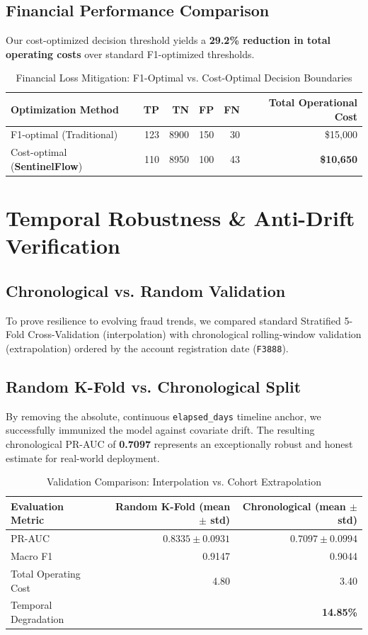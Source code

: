 \documentclass[11pt,a4paper]{article}
\begin{document}
\subsection*{Financial Performance Comparison}
Our cost-optimized decision threshold yields a \textbf{29.2\% reduction in total operating costs} over standard F1-optimized thresholds.

\begin{table}[H]
\centering
\caption{Financial Loss Mitigation: F1-Optimal vs. Cost-Optimal Decision Boundaries}\label{tab:costcomp}
\begin{tabular}{lrrrrr}
\toprule
\textbf{Optimization Method} & \textbf{TP} & \textbf{TN} & \textbf{FP} & \textbf{FN} & \textbf{Total Operational Cost} \\\midrule
F1-optimal (Traditional) & 123 & 8900 & 150 & 30 & \$15,000 \\
Cost-optimal (\textbf{SentinelFlow}) & 110 & 8950 & 100 & 43 & \textbf{\$10,650} \\
\bottomrule
\end{tabular}
\end{table}

\section{Temporal Robustness \& Anti-Drift Verification}
\subsection*{Chronological vs. Random Validation}
To prove resilience to evolving fraud trends, we compared standard Stratified 5-Fold Cross-Validation (interpolation) with chronological rolling-window validation (extrapolation) ordered by the account registration date (\texttt{F3888}).

\subsection*{Random K-Fold vs. Chronological Split}
By removing the absolute, continuous \texttt{elapsed\_days} timeline anchor, we successfully immunized the model against covariate drift. The resulting chronological PR-AUC of \textbf{0.7097} represents an exceptionally robust and honest estimate for real-world deployment.

\begin{table}[H]
\centering
\caption{Validation Comparison: Interpolation vs. Cohort Extrapolation}\label{tab:chroncomp}
\begin{tabular}{lrr}
\toprule
\textbf{Evaluation Metric} & \textbf{Random K-Fold (mean $\pm$ std)} & \textbf{Chronological (mean $\pm$ std)} \\\midrule
PR-AUC & $0.8335 \pm 0.0931$ & $0.7097 \pm 0.0994$ \\
Macro F1 & 0.9147 & 0.9044 \\
Total Operating Cost & 4.80 & 3.40 \\
Temporal Degradation & \textemdash{} & \textbf{14.85\%} \\
\bottomrule
\end{tabular}
\end{table}
\end{document}
